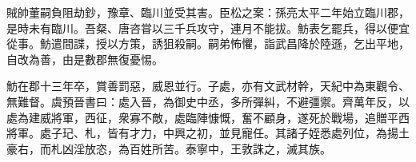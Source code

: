 \begin{pinyinscope}
賊帥董嗣負阻劫鈔，豫章、臨川並受其害。臣松之案：孫亮太平二年始立臨川郡，是時未有臨川。吾粲、唐咨甞以三千兵攻守，連月不能拔。魴表乞罷兵，得以便宜從事。魴遣間諜，授以方策，誘狙殺嗣。嗣弟怖懼，詣武昌降於陸遜，乞出平地，自改為善，由是數郡無復憂惕。

魴在郡十三年卒，賞善罰惡，威恩並行。子處，亦有文武材幹，天紀中為東觀令、無難督。虞預晉書曰：處入晉，為御史中丞，多所彈糾，不避彊禦。齊萬年反，以處為建威將軍，西征，衆寡不敵，處臨陣慷慨，奮不顧身，遂死於戰場，追贈平西將軍。處子玘、札，皆有才力，中興之初，並見寵任。其諸子姪悉處列位，為揚土豪右，而札凶淫放恣，為百姓所苦。泰寧中，王敦誅之，滅其族。


\end{pinyinscope}